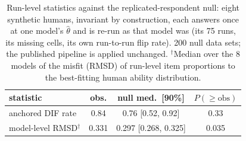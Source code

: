 \begin{table}[t]
\caption{Run-level statistics against the replicated-respondent null: eight synthetic humans, invariant by construction, each answers once at one model's $\hat\theta$ and is re-run as that model was (its 75 runs, its missing cells, its own run-to-run flip rate). 200 null data sets; the published pipeline is applied unchanged. $^\dagger$Median over the 8 models of the misfit (RMSD) of run-level item proportions to the best-fitting human ability distribution.}
\label{tab:runlevel}\centering\small\setlength{\tabcolsep}{4pt}
\begin{tabular}{lccc}\toprule
statistic & obs. & null med.\ [90\%] & $P(\ge\text{obs})$ \\\midrule
anchored DIF rate & 0.84 & 0.76 [0.52, 0.92] & 0.33 \\
model-level RMSD$^\dagger$ & 0.331 & 0.297 [0.268, 0.325] & 0.035 \\
\bottomrule
\end{tabular}\end{table}
